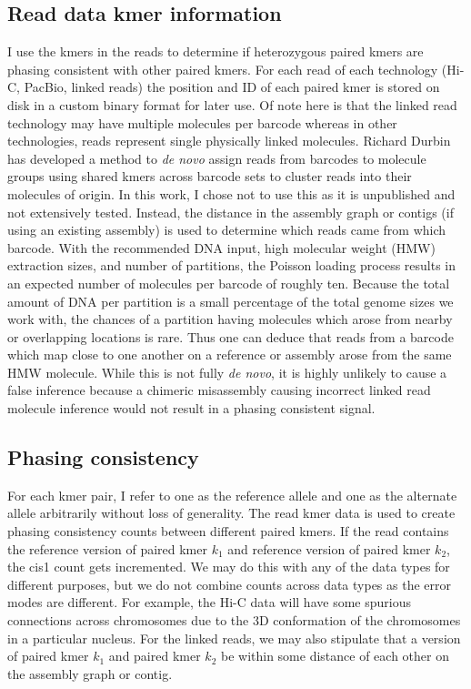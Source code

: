 \subsection{Read data kmer information}
\par{
I use the kmers in the reads to determine if heterozygous paired kmers are phasing consistent with other paired kmers. For each read of each technology (Hi-C, PacBio, linked reads) the position and ID of each paired kmer is stored on disk in a custom binary format for later use. Of note here is that the linked read technology may have multiple molecules per barcode whereas in other technologies, reads represent single physically linked molecules. Richard Durbin has developed a method to \textit{de novo} assign reads from barcodes to molecule groups using shared kmers across barcode sets to cluster reads into their molecules of origin\cite{hash10x}. In this work, I chose not to use this as it is unpublished and not extensively tested. Instead, the distance in the assembly graph or contigs (if using an existing assembly) is used to determine which reads came from which barcode. With the recommended DNA input, high molecular weight (HMW) extraction sizes, and number of partitions, the Poisson loading process results in an expected number of molecules per barcode of roughly ten. Because the total amount of DNA per partition is a small percentage of the total genome sizes we work with, the chances of a partition having molecules which arose from nearby or overlapping locations is rare. Thus one can deduce that reads from a barcode which map close to one another on a reference or assembly arose from the same HMW molecule. While this is not fully \textit{de novo}, it is highly unlikely to cause a false inference because a chimeric misassembly causing incorrect linked read molecule inference would not result in a phasing consistent signal.
}

\subsection{Phasing consistency}
\par{
For each kmer pair, I refer to one as the reference allele and one as the alternate allele arbitrarily without loss of generality. The read kmer data is used to create phasing consistency counts between different paired kmers. If the read contains the reference version of paired kmer $k_1$ and reference version of paired kmer $k_2$, the cis1 count gets incremented. We may do this with any of the data types for different purposes, but we do not combine counts across data types as the error modes are different. For example, the Hi-C data will have some spurious connections across chromosomes due to the 3D conformation of the chromosomes in a particular nucleus. For the linked reads, we may also stipulate that a version of paired kmer $k_1$ and paired kmer $k_2$ be within some distance of each other on the assembly graph or contig.
}
